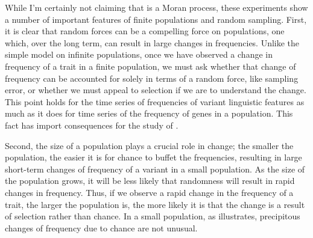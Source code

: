 \documentclass[output=paper]{langsci/langscibook}
\begin{document}
While I'm certainly not claiming that  is a Moran
process, these experiments show a number of important features of
finite populations and random sampling.  First, it is clear that
random forces can be a compelling force on populations, one which,
over the long term, can result in large changes in frequencies.
Unlike the simple model on infinite populations, once we have observed
a change in frequency of a trait in a finite population, we must ask
whether that change of frequency can be accounted for solely in terms
of a random force, like sampling error, or whether we must appeal to
selection if we are to understand the change. This point holds for the
time series of frequencies of variant linguistic features as much as
it does for time series of the frequency of genes in a population.
This fact has import consequences for the study of .

Second, the size of a population plays a crucial role in change; the smaller
the population, the easier it is for chance to buffet the frequencies,
resulting in large short-term changes of frequency of a variant in a small
population.  As the size of the population grows, it will be less likely that
randomness will result in rapid changes in frequency. Thus, if we observe a
rapid change in the frequency of a trait, the larger the population is, the
more likely it is that the change is a result of selection rather than chance.
In a small population, as  illustrates, precipitous changes
of frequency due to chance are not unusual.
\end{document}
